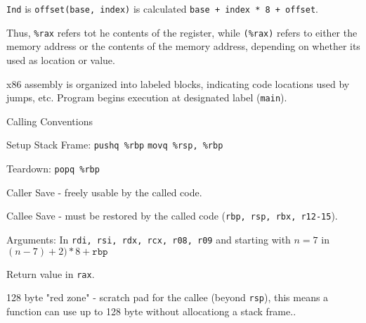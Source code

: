 \texttt{Ind} is  \texttt{offset(base, index)} is calculated \texttt{base + index * 8 + offset}.\medskip

Thus, \texttt{\%rax} refers tot he contents of the register, while \texttt{(\%rax)} refers to either the memory address or the contents of the memory address, depending on whether its used as location or value.\medskip
	
x86 assembly is organized into labeled blocks, indicating code locations used by jumps, etc. Program begins execution at designated label (\texttt{main}).\medskip
	
Calling Conventions
\begin{compactitem}
	\item Setup Stack Frame: \texttt{pushq \%rbp} \quad \texttt{movq \%rsp, \%rbp}
	
	\item Teardown: \texttt{popq \%rbp}
		
	\item Caller Save - freely usable by the called code.
	
	\item Callee Save - must be restored by the called code (\texttt{rbp, rsp, rbx, r12-15}).
		
	\item Arguments: In \texttt{rdi, rsi, rdx, rcx, r08, r09} and starting with $n = 7$ in $(n-7) + 2) * 8 + \texttt{rbp}$
		
	\item Return value in \texttt{rax}.

	\item 128 byte "red zone" - scratch pad for the callee (beyond \texttt{rsp}), this means a function can use up to 128 byte without allocationg a stack frame..
\end{compactitem}
